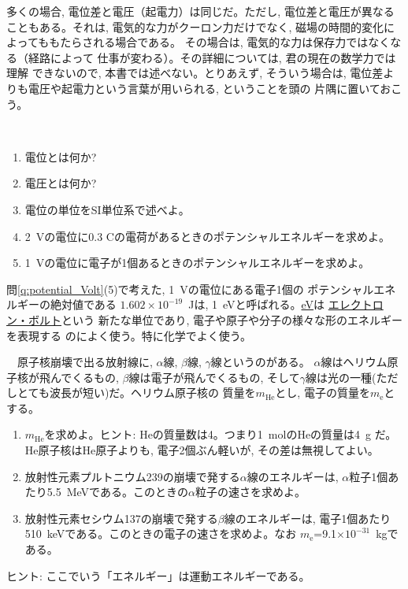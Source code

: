 多くの場合, 電位差と電圧（起電力）は同じだ。ただし, 
電位差と電圧が異なることもある。それは, 電気的な力がクーロン力だけでなく, 
磁場の時間的変化によってももたらされる場合である。
その場合は, 電気的な力は保存力ではなくなる（経路によって
仕事が変わる）。その詳細については, 君の現在の数学力では理解
できないので, 本書では述べない。とりあえず, そういう場合は, 
電位差よりも電圧や起電力という言葉が用いられる, ということを頭の
片隅に置いておこう。

\begin{q}\label{q:potential_Volt}　
\begin{enumerate}
\item 電位とは何か?
\item 電圧とは何か?
\item 電位の単位をSI単位系で述べよ。
\item 2~Vの電位に0.3 Cの電荷があるときのポテンシャルエネルギーを求めよ。
\item 1~Vの電位に電子が1個あるときのポテンシャルエネルギーを求めよ。
\end{enumerate}
\end{q}
\mv

問\ref{q:potential_Volt}(5)で考えた, 1~Vの電位にある電子1個の
ポテンシャルエネルギーの絶対値である
$1.602\times10^{-19}$~Jは, 1~eVと呼ばれる。\underline{eV}は
\underline{エレクトロン・ボルト}という
新たな単位であり, 電子や原子や分子の様々な形のエネルギーを表現する
のによく使う。特に化学でよく使う。\mv

\begin{q}\label{q:radiation_eV}　原子核崩壊で出る放射線に, 
$\alpha$線, $\beta$線, $\gamma$線というのがある。
$\alpha$線はヘリウム原子核が飛んでくるもの, $\beta$線は電子が飛んでくるもの, 
そして$\gamma$線は光の一種(ただしとても波長が短い)だ。ヘリウム原子核の
質量を$m_{\text{He}}$とし, 電子の質量を$m_{\text{e}}$とする。
\begin{enumerate}
\item $m_{\text{He}}$を求めよ。ヒント: Heの質量数は4。つまり1~molのHeの質量は4~g
だ。He原子核はHe原子よりも, 電子2個ぶん軽いが, その差は無視してよい。
\item 放射性元素プルトニウム239の崩壊で発する$\alpha$線のエネルギーは, 
$\alpha$粒子1個あたり5.5~MeVである。このときの$\alpha$粒子の速さを求めよ。
\item 放射性元素セシウム137の崩壊で発する$\beta$線のエネルギーは, 
電子1個あたり510~keVである。このときの電子の速さを求めよ。なお
$m_{\text{e}}$=9.1$\times10^{-31}$~kgである。
\end{enumerate}
ヒント: ここでいう「エネルギー」は運動エネルギーである。
\end{q}
\hv





